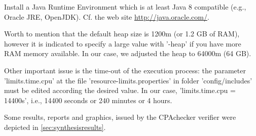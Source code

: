 Install a Java Runtime Environment which is at least Java 8 compatible (e.g., Oracle JRE, OpenJDK). Cf. the web site \url{http://java.oracle.com/}.

\bigskip
{} 
\bigskip

Worth to mention that the default heap size is 1200m (or 1.2 GB of RAM), however it is indicated to specify a large value with '-heap' if you have more RAM memory available. In our case, we adjusted the heap to 64000m (64 GB). 

Other important issue is the time-out of the execution process: the parameter 'limits.time.cpu' at the file 'resource-limits.properties' in folder 'config/includes' must be edited according the desired value. In our case, 'limits.time.cpu = 14400s', i.e., 14400 seconds or 240 minutes or 4 hours.

Some results, reports and graphics, issued by the CPAchecker verifier were depicted in \ref{sec:synthesisresults}.

